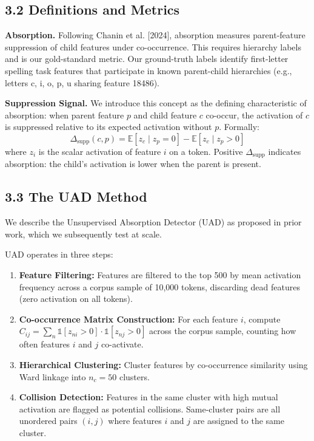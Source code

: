 \documentclass{article}
\begin{document}
\subsection{3.2 Definitions and Metrics}

\textbf{Absorption.} Following Chanin et al. [2024], absorption measures parent-feature suppression of child features under co-occurrence. This requires hierarchy labels and is our gold-standard metric. Our ground-truth labels identify first-letter spelling task features that participate in known parent-child hierarchies (e.g., letters c, i, o, p, u sharing feature 18486).

\textbf{Suppression Signal.} We introduce this concept as the defining characteristic of absorption: when parent feature $p$ and child feature $c$ co-occur, the activation of $c$ is suppressed relative to its expected activation without $p$. Formally:
$$\Delta_{\text{supp}}(c, p) = \mathbb{E}[z_c \mid z_p = 0] - \mathbb{E}[z_c \mid z_p > 0]$$
where $z_i$ is the scalar activation of feature $i$ on a token. Positive $\Delta_{\text{supp}}$ indicates absorption: the child's activation is lower when the parent is present.

\subsection{3.3 The UAD Method}

We describe the Unsupervised Absorption Detector (UAD) as proposed in prior work, which we subsequently test at scale.

UAD operates in three steps:
\begin{enumerate}
  \item \textbf{Feature Filtering:} Features are filtered to the top 500 by mean activation frequency across a corpus sample of 10,000 tokens, discarding dead features (zero activation on all tokens).
  \item \textbf{Co-occurrence Matrix Construction:} For each feature $i$, compute $C_{ij} = \sum_n \mathbb{1}[z_{ni} > 0] \cdot \mathbb{1}[z_{nj} > 0]$ across the corpus sample, counting how often features $i$ and $j$ co-activate.
  \item \textbf{Hierarchical Clustering:} Cluster features by co-occurrence similarity using Ward linkage into $n_c = 50$ clusters.
  \item \textbf{Collision Detection:} Features in the same cluster with high mutual activation are flagged as potential collisions. Same-cluster pairs are all unordered pairs $(i, j)$ where features $i$ and $j$ are assigned to the same cluster.
\end{enumerate}
\end{document}
